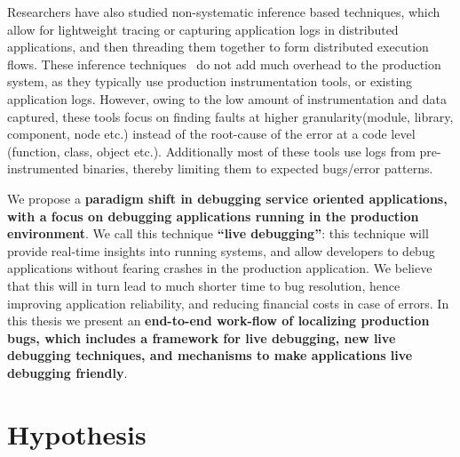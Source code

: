 Researchers have also studied non-systematic inference based techniques, which allow for lightweight tracing or capturing application logs in distributed applications, and then threading them together to form distributed execution flows.
These inference techniques~\cite{magpie,fmeter,vscope,clue,spectroscope} do not add much overhead to the production system, as they typically use production instrumentation tools, or existing application logs.
However, owing to the low amount of instrumentation and data captured, these tools focus on finding faults at higher granularity(module, library, component, node etc.) instead of the root-cause of the error at a code level (function, class, object etc.). 
Additionally most of these tools use logs from pre-instrumented binaries, thereby limiting them to expected bugs/error patterns.  

We propose a \textbf{ paradigm shift in debugging service oriented applications, with a focus on debugging applications running in the production environment}.
We call this technique \textbf{``live debugging''}: this technique will provide real-time insights into running systems, and allow developers to debug applications without fearing crashes in the production application.
We believe that this will in turn lead to much shorter time to bug resolution, hence improving application reliability, and reducing financial costs in case of errors.
In this thesis we present an \textbf{end-to-end work-flow of localizing production bugs, which includes a framework for live debugging, new live debugging techniques, and mechanisms to make applications live debugging friendly}.\\


\section{Hypothesis}
\label{sec:introHypothesis}

